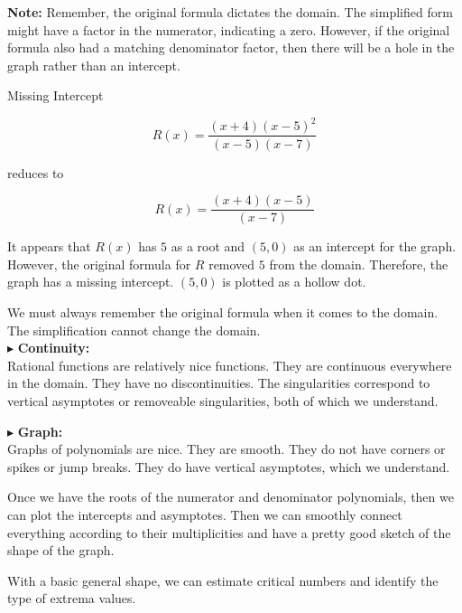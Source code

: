 \documentclass{ximera}
\begin{document}
\textbf{Note:} Remember, the original formula dictates the domain. The simplified form might have a factor in the numerator, indicating a zero. However, if the original formula also had a matching denominator factor, then there will be a hole in the graph rather than an intercept. 



\begin{example}  Missing Intercept

\[     R(x) = \frac{(x+4)(x-5)^2}{(x-5)(x-7)}     \]

reduces to 

\[     R(x) = \frac{(x+4)(x-5)}{(x-7)}     \]


It appears that $R(x)$ has $5$ as a root and $(5,0)$ as an intercept for the graph.  However, the original formula for $R$ removed $5$ from the domain.  Therefore, the graph has a missing intercept. $(5,0)$ is plotted as a hollow dot.






\end{example}

We must always remember the original formula when it comes to the domain.  The simplification cannot change the domain. \\





$\blacktriangleright$ \textbf{\textcolor{red!10!blue!90!}{Continuity:}} \\
Rational functions are relatively nice functions.  They are continuous everywhere in the domain.  They have no discontinuities.  The singularities correspond to vertical asymptotes or removeable singularities, both of which we understand.  



$\blacktriangleright$ \textbf{\textcolor{red!10!blue!90!}{Graph:}} \\
Graphs of polynomials are nice.  They are smooth.  They do not have corners or spikes or jump breaks. They do have vertical asymptotes, which we understand.


Once we have the roots of the numerator and denominator polynomials, then we can plot the intercepts and asymptotes.  Then we can smoothly connect everything according to their multiplicities and have a pretty good sketch of the shape of the graph.

With a basic general shape, we can estimate critical numbers and identify the type of extrema values. \\
\end{document}
